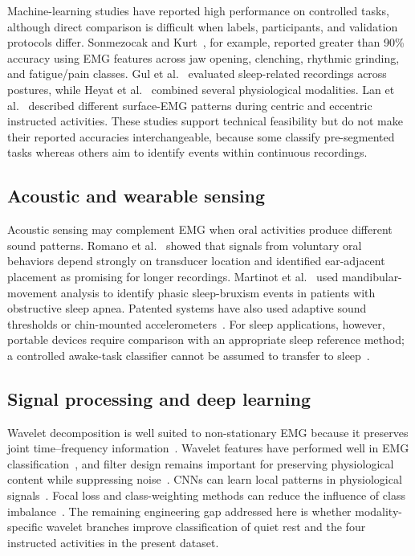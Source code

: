 \documentclass[pdflatex,sn-nature,iicol]{sn-jnl}
\begin{document}
\color{blue}
Machine-learning studies have reported high performance on controlled tasks, although direct comparison is difficult when labels, participants, and validation protocols differ. Sonmezocak and Kurt~\cite{sonmezocak2021detection}, for example, reported greater than 90\% accuracy using EMG features across jaw opening, clenching, rhythmic grinding, and fatigue/pain classes. Gul et al.~\cite{gul2024advanced} evaluated sleep-related recordings across postures, while Heyat et al.~\cite{heyat2020computational} combined several physiological modalities. Lan et al.~\cite{lan2022comparative} described different surface-EMG patterns during centric and eccentric instructed activities. These studies support technical feasibility but do not make their reported accuracies interchangeable, because some classify pre-segmented tasks whereas others aim to identify events within continuous recordings.
\color{black}

\color{blue}
\subsection{Acoustic and wearable sensing}
\color{black}

\color{blue}
Acoustic sensing may complement EMG when oral activities produce different sound patterns. Romano et al.~\cite{romano2024wearable} showed that signals from voluntary oral behaviors depend strongly on transducer location and identified ear-adjacent placement as promising for longer recordings. Martinot et al.~\cite{martinot2021artificial} used mandibular-movement analysis to identify phasic sleep-bruxism events in patients with obstructive sleep apnea. Patented systems have also used adaptive sound thresholds or chin-mounted accelerometers~\cite{haugland2020automatic,patwa2017bruxism}. For sleep applications, however, portable devices require comparison with an appropriate sleep reference method; a controlled awake-task classifier cannot be assumed to transfer to sleep~\cite{cidverdejo2024instrumental}.
\color{black}

\color{blue}
\subsection{Signal processing and deep learning}
\color{black}

\color{blue}
Wavelet decomposition is well suited to non-stationary EMG because it preserves joint time--frequency information~\cite{englehart2003robust}. Wavelet features have performed well in EMG classification~\cite{phinyomark2012feature}, and filter design remains important for preserving physiological content while suppressing noise~\cite{chowdhury2013surface}. CNNs can learn local patterns in physiological signals~\cite{faust2018deep,tsinganos2019improved}. Focal loss and class-weighting methods can reduce the influence of class imbalance~\cite{lin2017focal,johnson2019survey}. The remaining engineering gap addressed here is whether modality-specific wavelet branches improve classification of quiet rest and the four instructed activities in the present dataset.
\color{black}
\end{document}
